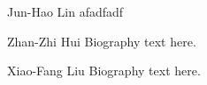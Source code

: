\documentclass[journal]{IEEEtran}
\begin{document}
\begin{IEEEbiography}{Jun-Hao Lin}
afadfadf
\end{IEEEbiography}

\begin{IEEEbiographynophoto}{Zhan-Zhi Hui}
	Biography text here.
\end{IEEEbiographynophoto}


\begin{IEEEbiographynophoto}{Xiao-Fang Liu}
	Biography text here.
\end{IEEEbiographynophoto}




\end{document}
